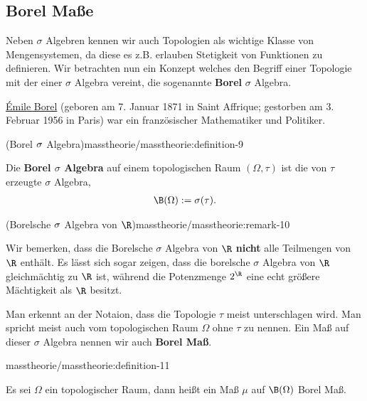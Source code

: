 \documentclass[letterpaper,10pt,german]{jupyterBook}
\begin{document}
\subsection{Borel Maße}
\label{\detokenize{masstheorie/masstheorie:borel-masze}}
\par
Neben \(\sigma\) Algebren kennen wir auch Topologien als wichtige Klasse von Mengensystemen, da diese es z.B. erlauben Stetigkeit von Funktionen zu definieren. Wir betrachten nun ein Konzept welches den Begriff einer Topologie mit der einer \(\sigma\) Algebra vereint, die sogenannte \textbf{Borel} \(\sigma\) Algebra.

\begin{emphBox}{}{}

\par
\href{https://de.wikipedia.org/wiki/\%C3\%89mile\_Borel}{Émile Borel} (geboren am 7. Januar 1871 in Saint Affrique; gestorben am 3. Februar 1956 in Paris) war ein französischer Mathematiker und Politiker.
\end{emphBox}
\begin{definition}{(Borel \protect\(\sigma\protect\) Algebra)}{masstheorie/masstheorie:definition-9}



\par
Die \textbf{Borel \(\sigma\) Algebra} auf einem topologischen Raum \((\Omega, \tau)\) ist die von \(\tau\) erzeugte \(\sigma\) Algebra,
\begin{align*}
\B(\Omega) := \sigma(\tau).
\end{align*}\end{definition}
\begin{remark}{(Borelsche \protect\(\sigma\protect\) Algebra von \protect\(\R\protect\))}{masstheorie/masstheorie:remark-10}



\par
Wir bemerken, dass die Borelsche \(\sigma\) Algebra von \(\R\) \textbf{nicht} alle Teilmengen von \(\R\) enthält.
Es lässt sich sogar zeigen, dass die borelsche \(\sigma\) Algebra von \(\R\) gleichmächtig zu \(\R\) ist, während die Potenzmenge \(2^\R\) eine echt größere Mächtigkeit als \(\R\) besitzt.
\end{remark}

\par
Man erkennt an der Notaion, dass die Topologie \(\tau\) meist unterschlagen wird. Man spricht meist auch vom topologischen Raum \(\Omega\) ohne \(\tau\) zu nennen.
Ein Maß auf dieser \(\sigma\) Algebra nennen wir auch \textbf{Borel Maß}.
\begin{definition}{}{masstheorie/masstheorie:definition-11}



\par
Es sei \(\Omega\) ein topologischer Raum, dann heißt ein Maß \(\mu\) auf \(\B(\Omega)\) Borel Maß.
\end{definition}
\end{document}
